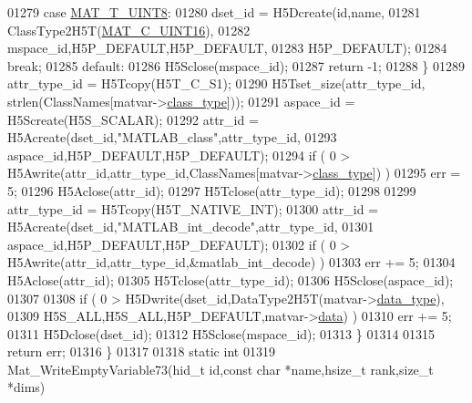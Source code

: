 \begin{DoxyCode}
{{01279             \textcolor{keywordflow}{case} \hyperlink{group___m_a_t_ggacf7b3b879282b7ab3a51190e49bf3453a01c1bd7db68f90552862eb5d311be408}{MAT\_T\_UINT8}:
01280                 dset\_id = H5Dcreate(\textcolor{keywordtype}{id},name,
01281                                     ClassType2H5T(\hyperlink{group___m_a_t_ggad4d60ae7b709fc81bfd744fb4c857c40a8bede21dbf6c1edc0bbccc1481bccae7}{MAT\_C\_UINT16}),
01282                                     mspace\_id,H5P\_DEFAULT,H5P\_DEFAULT,
01283                                     H5P\_DEFAULT);
01284                 \textcolor{keywordflow}{break};
01285             \textcolor{keywordflow}{default}:
01286                 H5Sclose(mspace\_id);
01287                 \textcolor{keywordflow}{return} -1;
01288         \}
01289         attr\_type\_id = H5Tcopy(H5T\_C\_S1);
01290         H5Tset\_size(attr\_type\_id, strlen(ClassNames[matvar->\hyperlink{group___m_a_t_aff13035bf3265dd7d9425e5d40c839d4}{class\_type}]));
01291         aspace\_id = H5Screate(H5S\_SCALAR);
01292         attr\_id = H5Acreate(dset\_id,\textcolor{stringliteral}{"MATLAB\_class"},attr\_type\_id,
01293                             aspace\_id,H5P\_DEFAULT,H5P\_DEFAULT);
01294         \textcolor{keywordflow}{if} ( 0 > H5Awrite(attr\_id,attr\_type\_id,ClassNames[matvar->\hyperlink{group___m_a_t_aff13035bf3265dd7d9425e5d40c839d4}{class\_type}]) )
01295             err = 5;
01296         H5Aclose(attr\_id);
01297         H5Tclose(attr\_type\_id);
01298 
01299         attr\_type\_id = H5Tcopy(H5T\_NATIVE\_INT);
01300         attr\_id = H5Acreate(dset\_id,\textcolor{stringliteral}{"MATLAB\_int\_decode"},attr\_type\_id,
01301                             aspace\_id,H5P\_DEFAULT,H5P\_DEFAULT);
01302         \textcolor{keywordflow}{if} ( 0 > H5Awrite(attr\_id,attr\_type\_id,&matlab\_int\_decode) )
01303             err += 5;
01304         H5Aclose(attr\_id);
01305         H5Tclose(attr\_type\_id);
01306         H5Sclose(aspace\_id);
01307 
01308         \textcolor{keywordflow}{if} ( 0 > H5Dwrite(dset\_id,DataType2H5T(matvar->\hyperlink{group___m_a_t_ab6aafe9bd77f0f077852593dec438144}{data\_type}),
01309                           H5S\_ALL,H5S\_ALL,H5P\_DEFAULT,matvar->\hyperlink{group___m_a_t_a5672978efa230bbdecdf38ede781f7fa}{data}) )
01310             err += 5;
01311         H5Dclose(dset\_id);
01312         H5Sclose(mspace\_id);
01313     \}
01314 
01315     \textcolor{keywordflow}{return} err;
01316 \}
01317 
01318 \textcolor{keyword}{static} \textcolor{keywordtype}{int}
01319 Mat\_WriteEmptyVariable73(hid\_t \textcolor{keywordtype}{id},\textcolor{keyword}{const} \textcolor{keywordtype}{char} *name,hsize\_t rank,\textcolor{keywordtype}{size\_t} *dims)
}}
\end{DoxyCode}
